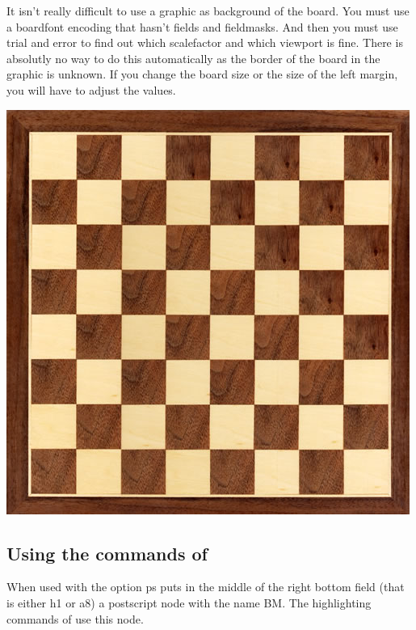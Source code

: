 \documentclass[pagesize,parskip=half-,fontsize=12pt]{scrartcl}
\begin{document}
It isn't really difficult to use a graphic as background of the
board. You must use a boardfont encoding that hasn't fields and
fieldmasks. And then you must use trial and error to find out which
scalefactor and which viewport is fine. There is absolutly no way to
do this automatically as the border of the board in the graphic is
unknown. If you change the board size or the size of the left margin,
you will have to adjust the values.



\subsection{Using the commands of \skaksty}

When used with the option \textsf{ps} \skaksty puts in the middle of
the right bottom field (that is either h1 or a8) a postscript node
with the name BM. The highlighting commands of \skaksty use this
node.
\end{document}
